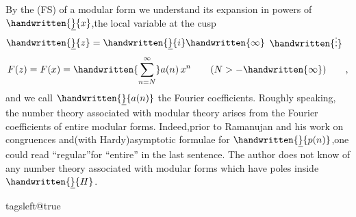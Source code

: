 By the   (FS)\unsure{-} of a modular form we understand its expansion in powers of $\handwritten{\underline}{x}$,the local variable at the cusp $\handwritten{\underline}{z}=\handwritten{\underline}{i}\handwritten{\infty}$ $\handwritten{\vdots}$
\[
F(z)=F(x)=\handwritten{\sum_{n=N}^{\infty}}a(n)\,x^{n}\qquad (N>-\handwritten{\infty})\qquad ,
\]
and we call \reversemarginpar{}\normalmarginpar $\handwritten{\underline}{a(n)}$ the Fourier coefficients. Roughly speaking, the number theory associated with modular theory arises from the Fourier coefficients of entire modular forms. Indeed,prior to Ramanujan and his work on congruences and(with Hardy)asymptotic formulae for $\handwritten{\underline}{p(n)}$,one could read ``regular''for ``entire'' in the last sentence. The author does not know of any number theory associated with modular forms which have poles inside $\handwritten{\underline}{H}$.
\endgroup

\noindent\hfill{}\par
\begingroup
\csname tagsleft@true\endcsname

